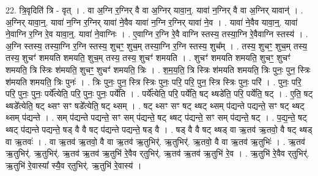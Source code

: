 \documentclass[17pt]{extarticle}
\begin{document}
22. त्रि॒वृदिति॑ त्रि - वृत् । . वा अ॒ग्नि र॒ग्निर् वै वा अ॒ग्निर् यावा॒न्॒. यावा॑ न॒ग्निर् वै वा अ॒ग्निर् यावान्॑ । . अ॒ग्निर् यावा॒न्॒. यावा॑ न॒ग्नि र॒ग्निर् यावा॑ ने॒वैव यावा॑ न॒ग्नि र॒ग्निर् यावा॑ ने॒व । . यावा॑ ने॒वैव यावा॒न्॒. यावा॑ ने॒वाग्नि र॒ग्नि रे॒व यावा॒न्॒. यावा॑ ने॒वाग्निः । . ए॒वाग्नि र॒ग्नि रे॒वै वाग्नि स्तस्य॒ तस्या॒ग्नि रे॒वैवाग्नि स्तस्य॑ । . अ॒ग्नि स्तस्य॒ तस्या॒ग्नि र॒ग्नि स्तस्य॒ शुचꣳ॒॒ शुच॒म् तस्या॒ग्नि र॒ग्नि स्तस्य॒ शुच᳚म् । . तस्य॒ शुचꣳ॒॒ शुच॒म् तस्य॒ तस्य॒ शुचꣳ॑ शमयति शमयति॒ शुच॒म् तस्य॒ तस्य॒ शुचꣳ॑ शमयति । . शुचꣳ॑ शमयति शमयति॒ शुचꣳ॒॒ शुचꣳ॑ शमयति॒ त्रि स्त्रिः श॑मयति॒ शुचꣳ॒॒ शुचꣳ॑ शमयति॒ त्रिः । . श॒म॒य॒ति॒ त्रि स्त्रिः श॑मयति शमयति॒ त्रिः पुनः॒ पुन॒ स्त्रिः श॑मयति शमयति॒ त्रिः पुनः॑ । . त्रिः पुनः॒ पुन॒ स्त्रि स्त्रिः पुनः॒ परि॒ परि॒ पुन॒ स्त्रि स्त्रिः पुनः॒ परि॑ । . पुनः॒ परि॒ परि॒ पुनः॒ पुनः॒ पर्ये᳚त्येति॒ परि॒ पुनः॒ पुनः॒ पर्ये॑ति । . पर्ये᳚त्येति॒ परि॒ पर्ये॑ति॒ षट् थ्षडे॑ति॒ परि॒ पर्ये॑ति॒ षट् । . ए॒ति॒ षट् थ्षडे᳚त्येति॒ षट् थ्सꣳ सꣳ षडे᳚त्येति॒ षट् थ्सम् । . षट् थ्सꣳ सꣳ षट् थ्षट् थ्सम् प॑द्यन्ते पद्यन्ते॒ सꣳ षट् थ्षट् थ्सम् प॑द्यन्ते । . सम् प॑द्यन्ते पद्यन्ते॒ सꣳ सम् प॑द्यन्ते॒ षट् थ्षट् प॑द्यन्ते॒ सꣳ सम् प॑द्यन्ते॒ षट् । . प॒द्य॒न्ते॒ षट् थ्षट् प॑द्यन्ते पद्यन्ते॒ षड् वै वै षट् प॑द्यन्ते पद्यन्ते॒ षड् वै । . षड् वै वै षट् थ्षड् वा ऋ॒तव॑ ऋ॒तवो॒ वै षट् थ्षड् वा ऋ॒तवः॑ । . वा ऋ॒तव॑ ऋ॒तवो॒ वै वा ऋ॒तव॑ ऋ॒तुभिर्॑. ऋ॒तुभिर्॑. ऋ॒तवो॒ वै वा ऋ॒तव॑ ऋ॒तुभिः॑ । . ऋ॒तव॑ ऋ॒तुभिर्॑. ऋ॒तुभिर्॑. ऋ॒तव॑ ऋ॒तव॑ ऋ॒तुभि॑ रे॒वैव र्‌तुभिर्॑. ऋ॒तव॑ ऋ॒तव॑ ऋ॒तुभि॑ रे॒व । . ऋ॒तुभि॑ रे॒वैव र्‌तुभिर्॑. ऋ॒तुभि॑ रे॒वास्या᳚ स्यै॒व र्‌तुभिर्॑. ऋ॒तुभि॑ रे॒वास्य॑ । \newline
\end{document}
